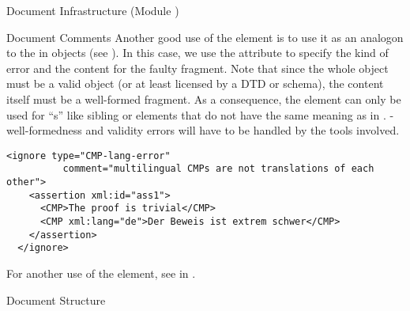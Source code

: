 \begin{tchapter}[id=omdoc-infrastructure,short=Document Infrastructure]{Document Infrastructure (Module {})}
\begin{tsection}[id=comments]{Document Comments}
Another good use of the {} element is to use it as an analogon to the
{} in {\openmath} objects (see
{}). In this case, we use the {} attribute to
specify the kind of error and the content for the faulty {\omdoc} fragment. Note that
since the whole object must be a valid {\omdoc} object (or at least licensed by a DTD or
schema), the content itself must be a well-formed {\omdoc} fragment. As a consequence, the
{} element can only be used for ``{s}'' like
sibling {} or {} elements that do not have the same meaning as
in {}. {\xml}-well-formedness and validity errors will have to be
handled by the {\xml} tools involved.

\begin{lstlisting}[label=lst:ignore-error,
  caption={Marking up Mathematical Errors Using {\element{ignore}}},
  numbers=none,index={ignore}]
  <ignore type="CMP-lang-error" 
          comment="multilingual CMPs are not translations of each other">
    <assertion xml:id="ass1">
      <CMP>The proof is trivial</CMP>
      <CMP xml:lang="de">Der Beweis ist extrem schwer</CMP>
    </assertion>
  </ignore>
\end{lstlisting}    
For another use of the {} element, see {} in
{}.
\end{tsection}

\begin{tsection}[id=sectioning]{Document Structure}


\end{tsection}
\end{tchapter}
